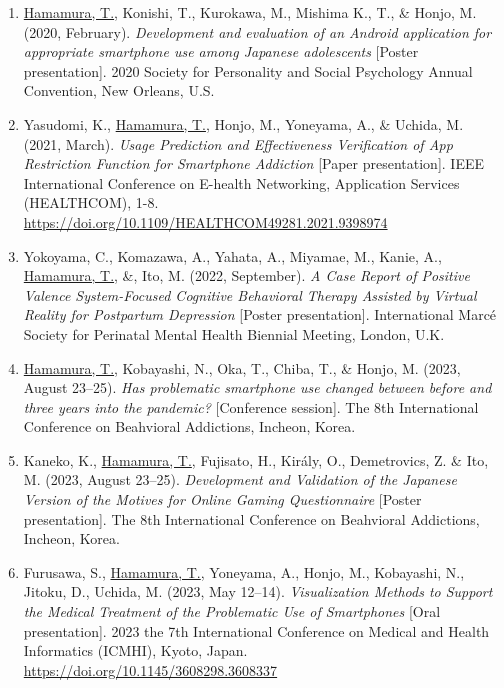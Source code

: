 \documentclass[a4paper]{article}
\begin{document}
\begin{enumerate}
	\item \underline{Hamamura, T.}, Konishi, T., Kurokawa, M., Mishima K., T., \& Honjo, M. (2020, February). \textit{Development and evaluation of an Android application for appropriate smartphone use among Japanese adolescents} [Poster presentation]. 2020 Society for Personality and Social Psychology Annual Convention, New Orleans, U.S.
	\item Yasudomi, K., \underline{Hamamura, T.}, Honjo, M., Yoneyama, A., \& Uchida, M. (2021, March). \textit{Usage Prediction and Effectiveness Verification of App Restriction Function for Smartphone Addiction} [Paper presentation]. IEEE International Conference on E-health Networking, Application Services (HEALTHCOM), 1-8. \url{https://doi.org/10.1109/HEALTHCOM49281.2021.9398974}
	\item Yokoyama, C., Komazawa, A., Yahata, A., Miyamae, M., Kanie, A., \underline{Hamamura, T.}, \&, Ito, M. (2022, September). \textit{A Case Report of Positive Valence System-Focused Cognitive Behavioral Therapy Assisted by Virtual Reality for Postpartum Depression} [Poster presentation]. International Marc\'e Society for Perinatal Mental Health Biennial Meeting, London, U.K.
	\item \underline{Hamamura, T.}, Kobayashi, N., Oka, T., Chiba, T., \& Honjo, M. (2023, August 23--25). \textit{Has problematic smartphone use changed between before and three years into the pandemic?} [Conference session]. The 8th International Conference on Beahvioral Addictions, Incheon, Korea.
	\item Kaneko, K., \underline{Hamamura, T.}, Fujisato, H., Király, O., Demetrovics, Z. \& Ito, M. (2023, August 23--25). \textit{Development and Validation of the Japanese Version of the Motives for Online Gaming Questionnaire} [Poster presentation]. The 8th International Conference on Beahvioral Addictions, Incheon, Korea.
	\item Furusawa, S., \underline{Hamamura, T.}, Yoneyama, A., Honjo, M., Kobayashi, N., Jitoku, D., Uchida, M. (2023, May 12--14). \textit{Visualization Methods to Support the Medical Treatment of the Problematic Use of Smartphones} [Oral presentation]. 2023 the 7th International Conference on Medical and Health Informatics (ICMHI), Kyoto, Japan.  \url{https://doi.org/10.1145/3608298.3608337}
\end{enumerate}
\end{document}
